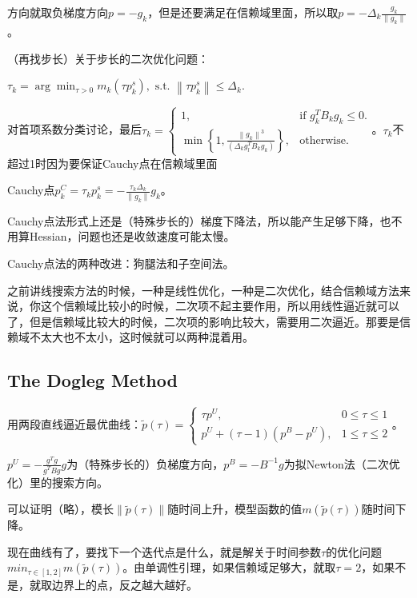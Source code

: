 方向就取负梯度方向$p = -g_k$，但是还要满足在信赖域里面，所以取$p = - \Delta_k \frac{g_k}{\|g_k\|}$。

（再找步长）关于步长的二次优化问题：

$\tau_{k}=\arg \min _{\tau>0} m_{k}\left(\tau p_{k}^{s}\right), \text { s.t. }\left\|\tau p_{k}^{s}\right\| \leq \Delta_{k}$.

对首项系数分类讨论，最后$\tau_{k}=\left\{\begin{array}{ll}
  1, & \text {if } g_{k}^{T} B_{k} g_{k} \leq 0. \\
  \min \left\{1, \frac{\left\|g_{k}\right\|^{3}}{\left(\Delta_{k} g_{l}^{T} B_{k} g_{k}\right)}\right\}, & \text {otherwise. }
\end{array}\right.$。$\tau_k$不超过1时因为要保证Cauchy点在信赖域里面

Cauchy点$p_{k}^{C} = \tau_k p_{k}^{s} = - \frac{\tau_k \Delta_k}{\|g_k\|} g_k$。

Cauchy点法形式上还是（特殊步长的）梯度下降法，所以能产生足够下降，也不用算Hessian，问题也还是收敛速度可能太慢。

Cauchy点法的两种改进：狗腿法和子空间法。

之前讲线搜索方法的时候，一种是线性优化，一种是二次优化，结合信赖域方法来说，你这个信赖域比较小的时候，二次项不起主要作用，所以用线性逼近就可以了，但是信赖域比较大的时候，二次项的影响比较大，需要用二次逼近。那要是信赖域不太大也不太小，这时候就可以两种混着用。

\subsection{The Dogleg Method}

用两段直线逼近最优曲线：$\tilde{p}(\tau) = \left\{\begin{array}{cl}
  \tau p^{U}, & 0 \leq \tau \leq 1 \\
  p^{U}+(\tau-1)\left(p^{B}-p^{U}\right), & 1 \leq \tau \leq 2
\end{array}\right.$。

$p^{U}=-\frac{g^{T} g}{g^{T} B g} g$为（特殊步长的）负梯度方向，$p^B = - B^{-1} g$为拟Newton法（二次优化）里的搜索方向。

可以证明（略），模长$\|\tilde{p}(\tau)\|$随时间上升，模型函数的值$m(\tilde{p}(\tau))$随时间下降。

现在曲线有了，要找下一个迭代点是什么，就是解关于时间参数$\tau$的优化问题$min_{\tau \in [1, 2]} m(\tilde{p}(\tau))$。由单调性引理，如果信赖域足够大，就取$\tau = 2$，如果不是，就取边界上的点，反之越大越好。

